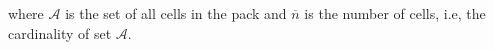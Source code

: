 \documentclass[10pt,twocolumn]{IEEEtran}
\begin{document}
\noindent where $\mathcal{A}$ is the set of all cells in the pack and $\overline{n}$ is the number of cells, i.e, the cardinality of set $\mathcal{A}$. 
%
%
%
\vspace{-0.3cm}
\end{document}
